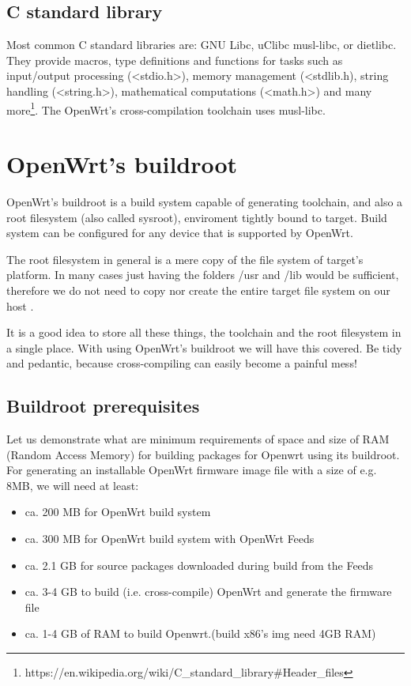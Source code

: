 \subsection{C standard library}

Most common C standard libraries are: GNU Libc, uClibc musl-libc, or dietlibc.
They provide macros, type definitions and functions for tasks such as input/output processing (<stdio.h>), memory management (<stdlib.h), string handling (<string.h>), mathematical computations (<math.h>) and many more\footnote{https://en.wikipedia.org/wiki/C\_standard\_library\#Header\_files}.
The OpenWrt's cross-compilation toolchain uses musl-libc.

\section{OpenWrt's buildroot}

OpenWrt's buildroot is a build system capable of generating toolchain, and also a root filesystem (also called sysroot), enviroment tightly bound to target.
Build system can be configured for any device that is supported by OpenWrt.

The root filesystem in general is a mere copy of the file system of target's platform.
In many cases just having the folders /usr and /lib would be sufficient, therefore we do not need to copy nor create the entire target file system on our host .

It is a good idea to store all these things, the toolchain and the root filesystem in a single place.
With using OpenWrt's buildroot we will have this covered.
Be tidy and pedantic, because cross-compiling can easily become a painful mess!

\subsection{Buildroot prerequisites}

Let us demonstrate what are minimum requirements of space and size of RAM (Random Access Memory) for building packages for Openwrt using its buildroot.
For generating an installable OpenWrt firmware image file with a size of e.g. 8MB, we will need at least:
\begin{itemize}
\item ca. 200 MB for OpenWrt build system
\item ca. 300 MB for OpenWrt build system with OpenWrt Feeds
\item ca. 2.1 GB for source packages downloaded during build from the Feeds
\item ca. 3-4 GB to build (i.e. cross-compile) OpenWrt and generate the firmware file
\item ca. 1-4 GB of RAM to build Openwrt.(build x86's img need 4GB RAM)
\end{itemize}

